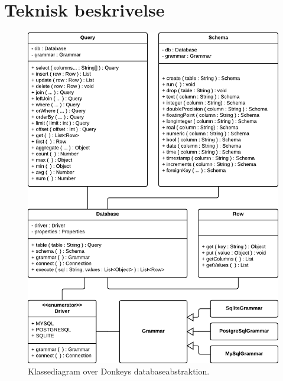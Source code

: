 \chapter{Teknisk beskrivelse}

\begin{figure}
  \centering
  \includegraphics[scale=0.75]{images/database-abstraction.pdf}
  \caption{Klassediagram over Donkeys databaseabstraktion.}
\end{figure}

